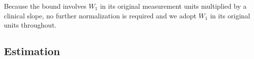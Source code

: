 \documentclass[AMA,Times1COL]{WileyNJDv5}
\begin{document}
Because the bound involves $W_1$ in its original measurement units multiplied by a clinical slope, no further normalization is required and we adopt $W_1$ in its original units throughout.

\subsection{Estimation}\label{sec:estimation}
\end{document}
